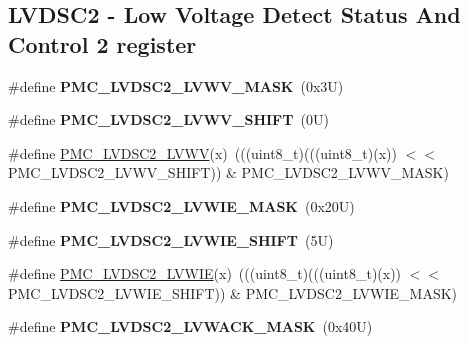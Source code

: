 \subsection*{L\+V\+D\+S\+C2 -\/ Low Voltage Detect Status And Control 2 register}
\begin{DoxyCompactItemize}
\item 
\mbox{\label{group___p_m_c___register___masks_gaab1198a446bb9b8412589eeb12311666}} 
\#define {\bfseries P\+M\+C\+\_\+\+L\+V\+D\+S\+C2\+\_\+\+L\+V\+W\+V\+\_\+\+M\+A\+SK}~(0x3\+U)
\item 
\mbox{\label{group___p_m_c___register___masks_gabd2e288b833d9e66c422b814dc7b5f03}} 
\#define {\bfseries P\+M\+C\+\_\+\+L\+V\+D\+S\+C2\+\_\+\+L\+V\+W\+V\+\_\+\+S\+H\+I\+FT}~(0\+U)
\item 
\#define \mbox{\hyperlink{group___p_m_c___register___masks_ga4599ee84bb111c3f42a8613447ca823d}{P\+M\+C\+\_\+\+L\+V\+D\+S\+C2\+\_\+\+L\+V\+WV}}(x)~(((uint8\+\_\+t)(((uint8\+\_\+t)(x)) $<$$<$ P\+M\+C\+\_\+\+L\+V\+D\+S\+C2\+\_\+\+L\+V\+W\+V\+\_\+\+S\+H\+I\+FT)) \& P\+M\+C\+\_\+\+L\+V\+D\+S\+C2\+\_\+\+L\+V\+W\+V\+\_\+\+M\+A\+SK)
\item 
\mbox{\label{group___p_m_c___register___masks_ga3a9de69524d99d6ec8985d211bc7861d}} 
\#define {\bfseries P\+M\+C\+\_\+\+L\+V\+D\+S\+C2\+\_\+\+L\+V\+W\+I\+E\+\_\+\+M\+A\+SK}~(0x20\+U)
\item 
\mbox{\label{group___p_m_c___register___masks_gaf5cb9cf53bade8254aa7749b5eb36eff}} 
\#define {\bfseries P\+M\+C\+\_\+\+L\+V\+D\+S\+C2\+\_\+\+L\+V\+W\+I\+E\+\_\+\+S\+H\+I\+FT}~(5\+U)
\item 
\#define \mbox{\hyperlink{group___p_m_c___register___masks_ga48d1cdfca4a7c154993c1e741101a07d}{P\+M\+C\+\_\+\+L\+V\+D\+S\+C2\+\_\+\+L\+V\+W\+IE}}(x)~(((uint8\+\_\+t)(((uint8\+\_\+t)(x)) $<$$<$ P\+M\+C\+\_\+\+L\+V\+D\+S\+C2\+\_\+\+L\+V\+W\+I\+E\+\_\+\+S\+H\+I\+FT)) \& P\+M\+C\+\_\+\+L\+V\+D\+S\+C2\+\_\+\+L\+V\+W\+I\+E\+\_\+\+M\+A\+SK)
\item 
\mbox{\label{group___p_m_c___register___masks_ga8b0c8bcad4d38e6ff797e9bc3d9db6d7}} 
\#define {\bfseries P\+M\+C\+\_\+\+L\+V\+D\+S\+C2\+\_\+\+L\+V\+W\+A\+C\+K\+\_\+\+M\+A\+SK}~(0x40\+U)

\end{DoxyCompactItemize}
